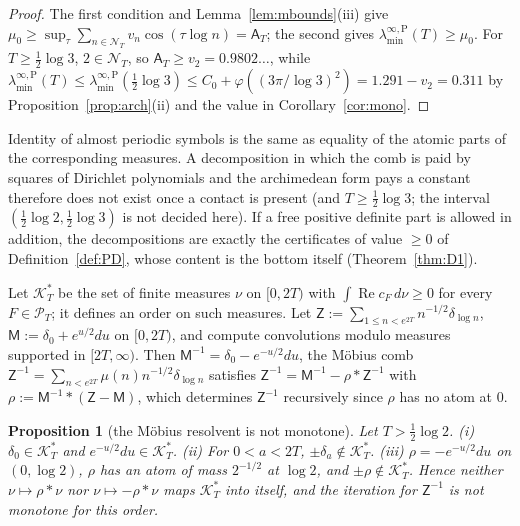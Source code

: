 \documentclass[11pt]{amsart}
\newtheorem{proposition}[theorem]{Proposition}
\theoremstyle{definition}
\theoremstyle{remark}
\newcommand{\Rel}{\operatorname{Re}}
\newcommand{\PT}{\mathcal P_T}
\newcommand{\cF}{c_F}
\newcommand{\NT}{\mathcal N_T}
\newcommand{\Aconst}{\mathsf A_T}
\newcommand{\laminfP}{\lambda^{\infty,\mathrm P}_{\min}}
\begin{document}
\begin{proof}
The first condition and Lemma~\ref{lem:mbounds}(iii) give $\mu_0\ge\sup_\tau\sum_{n\in\NT}v_n\cos(\tau\log n)=\Aconst$; the second gives
$\laminfP(T)\ge\mu_0$. For $T\ge\frac12\log3$, $2\in\NT$, so $\Aconst\ge v_2=0.9802\ldots$, while
$\laminfP(T)\le\laminfP(\frac12\log3)\le C_0+\varphi((3\pi/\log3)^2)=1.291-v_2=0.311$ by Proposition~\ref{prop:arch}(ii) and the value in
Corollary~\ref{cor:mono}.
\end{proof}

Identity of almost periodic symbols is the same as equality of the atomic parts of the corresponding measures. A
decomposition in which the comb is paid by squares of Dirichlet polynomials and the archimedean form pays a constant
therefore does not exist once a contact is present (and $T\ge\frac12\log3$; the interval $(\frac12\log2,\frac12\log3)$ is not
decided here). If a free positive definite part is allowed in addition, the decompositions are exactly the certificates of
value $\ge0$ of Definition~\ref{def:PD}, whose content is the bottom itself (Theorem~\ref{thm:D1}).

Let $\mathcal K^*_T$ be the set of finite measures $\nu$ on $[0,2T)$ with $\int\Rel\cF\,d\nu\ge0$ for every $F\in\PT$; it
defines an order on such measures. Let $\mathsf Z:=\sum_{1\le n<e^{2T}}n^{-1/2}\delta_{\log n}$, $\mathsf M:=\delta_0+e^{u/2}du$ on $[0,2T)$, and
compute convolutions modulo measures supported in $[2T,\infty)$. Then $\mathsf M^{-1}=\delta_0-e^{-u/2}du$, the M\"obius comb
$\mathsf Z^{-1}=\sum_{n<e^{2T}}\mu(n)n^{-1/2}\delta_{\log n}$ satisfies $\mathsf Z^{-1}=\mathsf M^{-1}-\rho*\mathsf Z^{-1}$ with
$\rho:=\mathsf M^{-1}*(\mathsf Z-\mathsf M)$, which determines $\mathsf Z^{-1}$ recursively since $\rho$ has no atom at $0$.

\begin{proposition}[the M\"obius resolvent is not monotone]\label{prop:cone}
Let $T>\frac12\log2$. \emph{(i)} $\delta_0\in\mathcal K^*_T$ and $e^{-u/2}du\in\mathcal K^*_T$. \emph{(ii)} For $0<a<2T$, $\pm\delta_a\notin\mathcal K^*_T$.
\emph{(iii)} $\rho=-e^{-u/2}du$ on $(0,\log2)$, $\rho$ has an atom of mass $2^{-1/2}$ at $\log2$, and $\pm\rho\notin\mathcal K^*_T$. Hence neither
$\nu\mapsto\rho*\nu$ nor $\nu\mapsto-\rho*\nu$ maps $\mathcal K^*_T$ into itself, and the iteration for $\mathsf Z^{-1}$ is not monotone for this
order.
\end{proposition}
\end{document}
